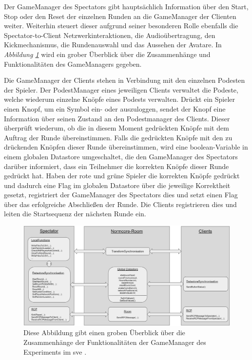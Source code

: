 \documentclass[a4paper,11pt]{article}%
\renewcommand{\\}{\vspace*{0.5\baselineskip} \newline}
\begin{document}
{Der GameManager des Spectators gibt hauptsächlich Information über den Start, Stop oder den Reset der einzelnen Runden an die GameManager der Clienten weiter. Weiterhin steuert dieser aufgrund seiner besonderen Rolle ebenfalls die Spectator-to-Client Netzwerkinteraktionen, die Audioübertragung, den Kickmechanismus, die Rundenauswahl und das Aussehen der Avatare.
In \textit{Abbildung \ref{GameManagerClientSpectator}} wird ein grober Überblick über die Zusammenhänge und Funktionalitäten des GameManagers gegeben.

Die GameManager der Clients stehen in Verbindung mit den einzelnen Podesten der Spieler. Der PodestManager eines jeweiligen Clients verwaltet die Podeste, welche wiederum einzelne Knöpfe eines Podests verwalten. 
Drückt ein Spieler einen Knopf, um ein Symbol ein- oder auszuloggen, sendet der Knopf eine Information über seinen Zustand an den Podestmanager des Clients. Dieser überprüft wiederum, ob die in diesem Moment gedrückten Knöpfe mit dem Auftrag der Runde übereinstimmen. Falls die gedrückten Knöpfe mit den zu drückenden Knöpfen dieser Runde übereinstimmen, wird eine boolean-Variable in einem globalen Datastore umgeschaltet, die den GameManager des Spectators darüber informiert, dass ein Teilnehmer die korrekten Knöpfe dieser Runde gedrückt hat. Haben der rote und grüne Spieler die korrekten Knöpfe gedrückt und dadurch eine Flag im globalen Datastore über die jeweilige Korrektheit gesetzt, registriert der GameManager des Spectators dies und setzt einen Flag über das erfolgreiche Abschließen der Runde. Die Clients registrieren dies und leiten die Startsequenz der nächsten Runde ein. 

\begin{figure}[H]
		\begin{footnotesize}
		\centering
			\includegraphics[width=\textwidth]{Abbildungen/GameManagerClientSpectator.jpg}
			\caption[Funktionalitäten des GameManagers]{Diese Abbildung gibt einen groben Überblick über die Zusammenhänge der Funktionalitäten der GameManager des Experiments im \ac{sve} .}
			\label{GameManagerClientSpectator}
		\end{footnotesize}
	\end{figure}

}
\end{document}
